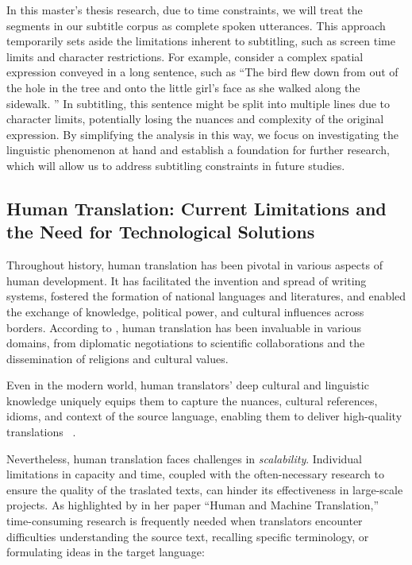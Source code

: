 In this master's thesis research, due to time constraints, we will treat the segments in our subtitle corpus as complete spoken utterances. This approach temporarily sets aside the limitations inherent to subtitling, such as screen time limits and character restrictions. For example, consider a complex spatial expression conveyed in a long sentence, such as ``The bird flew down from out of the hole in the tree and onto the little girl's face as she walked along the sidewalk. '' In subtitling, this sentence might be split into multiple lines due to character limits, potentially losing the nuances and complexity of the original expression. By simplifying the analysis in this way, we focus on investigating the linguistic phenomenon at hand and establish a foundation for further research, which will allow us to address subtitling constraints in future studies.


\subsection{Human Translation: Current Limitations and the Need for Technological Solutions}

Throughout history, human translation has been pivotal in various aspects of human development. It has facilitated the invention and spread of writing systems, fostered the formation of national languages and literatures, and enabled the exchange of knowledge, political power, and cultural influences across borders. According to \textcite{house2014translation}, human translation has been invaluable in various domains, from diplomatic negotiations to scientific collaborations and the dissemination of religions and cultural values.

Even in the modern world, human translators' deep cultural and linguistic knowledge uniquely equips them to capture the nuances, cultural references, idioms, and context of the source language, enabling them to deliver high-quality translations ~\parencite{dalayli-2023-use}.

Nevertheless, human translation faces challenges in \emph{scalability}. Individual limitations in capacity and time, coupled with the often-necessary research to ensure the quality of the traslated texts, can hinder its effectiveness in large-scale projects. As highlighted by \textcite{kenny2022human} in her paper ``Human and Machine Translation,'' time-consuming research is frequently needed when translators encounter difficulties understanding the source text, recalling specific terminology, or formulating ideas in the target language:

